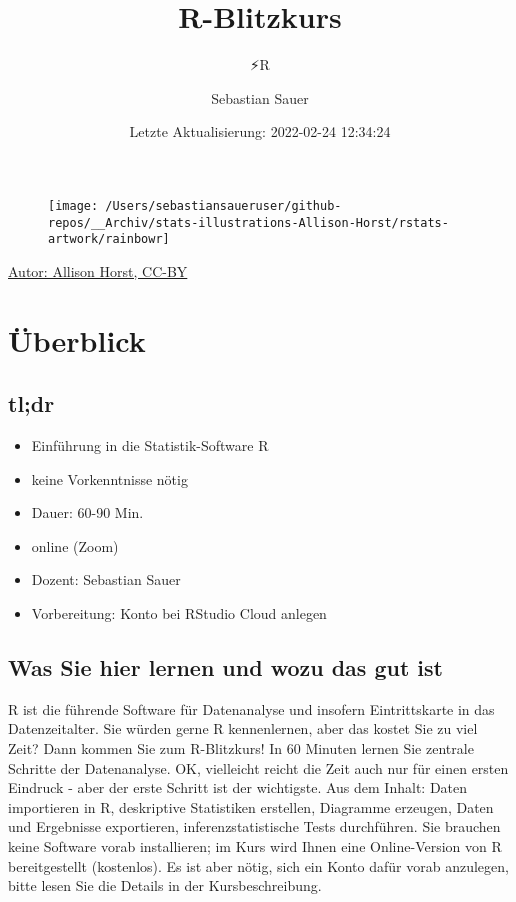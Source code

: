 \documentclass[
]{book}
\title{R-Blitzkurs}
\subtitle{⚡R}
\author{Sebastian Sauer}
\date{Letzte Aktualisierung: 2022-02-24 12:34:24}
\providecommand{\tightlist}{%
  \setlength{\itemsep}{0pt}\setlength{\parskip}{0pt}}
\begin{document}
\maketitle

{
\setcounter{tocdepth}{1}
\tableofcontents
}
\begin{figure}[H]

{\centering \texttt{[image: /Users/sebastiansaueruser/github-repos/\_\_Archiv/stats-illustrations-Allison-Horst/rstats-artwork/rainbowr]} 

}

\end{figure}

\href{https://github.com/allisonhorst/stats-illustrations}{Autor: Allison Horst, CC-BY}

\hypertarget{uxfcberblick}{%
\chapter{Überblick}\label{uxfcberblick}}

\hypertarget{tldr}{%
\section{tl;dr}\label{tldr}}

\begin{itemize}
\tightlist
\item
  Einführung in die Statistik-Software R
\item
  keine Vorkenntnisse nötig
\item
  Dauer: 60-90 Min.
\item
  online (Zoom)
\item
  Dozent: Sebastian Sauer
\item
  Vorbereitung: Konto bei RStudio Cloud anlegen
\end{itemize}

\hypertarget{was-sie-hier-lernen-und-wozu-das-gut-ist}{%
\section{Was Sie hier lernen und wozu das gut ist}\label{was-sie-hier-lernen-und-wozu-das-gut-ist}}

R ist die führende Software für Datenanalyse und insofern Eintrittskarte in das Datenzeitalter.
Sie würden gerne R kennenlernen, aber das kostet Sie zu viel Zeit?
Dann kommen Sie zum R-Blitzkurs! In 60 Minuten lernen Sie zentrale Schritte der Datenanalyse.
OK, vielleicht reicht die Zeit auch nur für einen ersten Eindruck -
aber der erste Schritt ist der wichtigste.
Aus dem Inhalt: Daten importieren in R, deskriptive Statistiken erstellen, Diagramme erzeugen, Daten und Ergebnisse exportieren, inferenzstatistische Tests durchführen.
Sie brauchen keine Software vorab installieren; im Kurs wird Ihnen eine Online-Version von R bereitgestellt (kostenlos).
Es ist aber nötig, sich ein Konto dafür vorab anzulegen, bitte lesen Sie die Details in der Kursbeschreibung.
\end{document}
